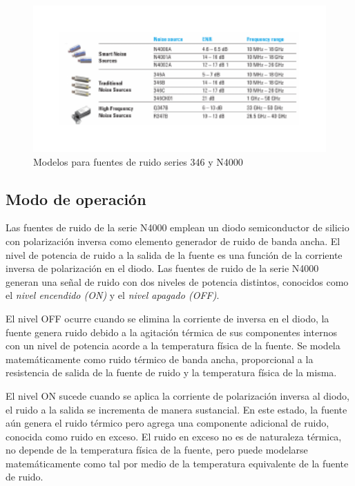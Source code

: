 	\begin{figure}[h!]
		\centering
		\includegraphics[width=15cm]{Imagenes/TablaFuentesRuido.pdf}
		\caption{Modelos para fuentes de ruido series 346 y N4000}
		\label{Fig:ModelosFuenteRuido}
	\end{figure}
	
	\subsection{Modo de operación}
	Las fuentes de ruido de la serie N4000 emplean un diodo semiconductor de silicio con polarización inversa como elemento generador de ruido de banda ancha. El nivel de potencia de ruido a la salida de la fuente es una función de la corriente inversa de polarización en el diodo. Las fuentes de ruido de la serie N4000 generan una señal de ruido con dos niveles de potencia distintos, conocidos como el \emph{nivel encendido (ON)} y el \emph{nivel apagado (OFF)}. 
	
	El nivel OFF ocurre cuando se elimina la corriente de inversa en el diodo, la fuente genera ruido debido a la agitación térmica de sus componentes internos con un nivel de potencia acorde a la temperatura física de la fuente. Se modela matemáticamente como ruido térmico de banda ancha, proporcional a la resistencia de salida de la fuente de ruido y la temperatura física de la misma. 
	
	El nivel ON sucede cuando se aplica la corriente de polarización inversa al diodo, el ruido a la salida se incrementa de manera sustancial. En este estado, la fuente aún genera el ruido térmico pero agrega una componente adicional de ruido, conocida como ruido en exceso. El ruido en exceso no es de naturaleza térmica, no depende de la temperatura física de la fuente, pero puede modelarse matemáticamente como tal por medio de la temperatura equivalente de la fuente de ruido.
	
